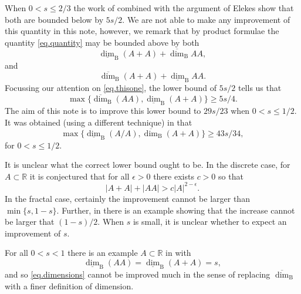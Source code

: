 \documentclass[12pt]{amsart}
\newcommand{\R}{\mathbb{R}}\newcommand{\C}{\mathbb{C}}
\newcommand{\lbox}{\underline\dim_{\mathrm{B}}}
\newcommand{\ubox}{\overline\dim_{\mathrm{B}}}
\newcommand{\1}{\mathbf{1}}
\newcommand{\e}{\epsilon}
\begin{document}
    When $0 < s \leq 2/3$ the work of \cite{renwang} combined with the argument of Elekes \cite{elekes1997number} show that both are bounded below by $5s/2.$ We are not able to make any improvement of this quantity in this note, however, we remark that by product formulae the quantity \eqref{eq.quantity} may be bounded above by both
\begin{equation}\label{eq.thisone}
\lbox{(A+A)} + \ubox{AA},
\end{equation}
and \begin{equation}
    \ubox{(A+A)} + \lbox{AA}.
\end{equation}
Focussing our attention on \eqref{eq.thisone}, the lower bound of $5s/2$ tells us that
\begin{equation}\label{eq.dimensions}
     \max\{\ubox{(AA)}, \lbox {(A+A)}\} \geq 5s/4.
\end{equation}
The aim of this note is to improve this lower bound to $29s / 23$ when $0 < s \leq 1/2.$ It was obtained (using a different technique) in \cite{doprod} that 
\begin{equation}
     \max\{\lbox{(A/A)}, \ubox {(A+A)}\} \geq 43s/34,
\end{equation}
for $0 < s \leq 1/2.$ 

It is unclear what the correct lower bound ought to be. In the discrete case, for $A \subset \R$ it is conjectured that for all $\e > 0$ there exists $c > 0$ so that
$$|A+A| + |AA| > c|A|^{2-\e}.$$
In the fractal case, certainly the improvement cannot be larger than $\min\{s,1-s\}.$ Further, in \cite{mator} there is an example showing that the increase cannot be larger that $(1-s)/2.$ When $s$ is small, it is unclear whether to expect an improvement of $s.$

For all $0 < s < 1$ there is an example $A \subset \R$ in \cite{mator} with 
$$\lbox(AA) =  \lbox(A+A) = s,$$
and so \eqref{eq.dimensions} cannot be improved much in the sense of replacing $\ubox$ with a finer definition of dimension.
 
\end{document}
